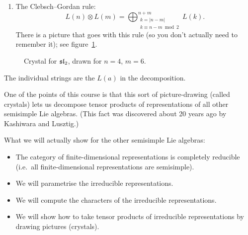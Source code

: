 \begin{properties}
\begin{enumerate}
    \begin{example}
    We can now compute $L(1) \otimes L(3)$:
    \begin{align*}
      \ch L(1) \cdot \ch L(3) &= (z + z^{-1})(z^3 + z + z^{-1} + z^{-3})\\
        &= (z^4 + z^2 + 1 + z^{-2} + z^{-4}) + (z^2 + 1 + z^{-2})
         = \ch L(4) + \ch L(2),
    \end{align*}
    so $L(1) \otimes L(3) = L(4) \oplus L(2)$.
    \end{example}
  \item The Clebsch--Gordan rule:
    \[
      L(n) \otimes L(m) = \bigoplus_{\substack{k = |n - m|\\ k \equiv n - m \bmod 2}}^{n + m} L(k).
    \]
    There is a picture that goes with this rule (so you don't actually need to
    remember it); see figure~\ref{fig:crystal-sl2}.
\end{enumerate}
\end{properties}

\begin{figure}[!htbp]
  \centering
  \slcrystal
  \caption{Crystal for $\sl_2$, drawn for $n = 4$, $m = 6$.}
  \label{fig:crystal-sl2}
\end{figure}

The individual strings are the $L(a)$ in the decomposition.

One of the points of this course is that this sort of picture-drawing (called
crystals) lets us decompose tensor products of representations of all other
semisimple Lie algebras. (This fact was discovered about 20 years ago by
Kashiwara and Lusztig.)

What we will actually show for the other semisimple Lie algebras:
\begin{itemize}
  \item The category of finite-dimensional representations is completely
    reducible (i.e.\ all finite-dimensional representations are semisimple).
  \item We will parametrise the irreducible representations.
  \item We will compute the characters of the irreducible representations.
  \item We will show how to take tensor products of irreducible
    representations by drawing pictures (crystals).
\end{itemize}
